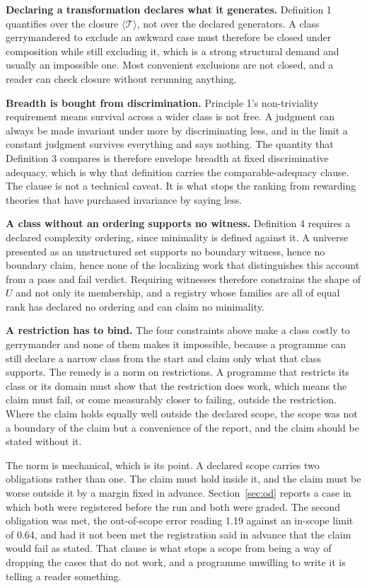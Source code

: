 \documentclass[11pt]{article}
\theoremstyle{remark}
\begin{document}
\textbf{Declaring a transformation declares what it generates.} Definition 1
quantifies over the closure $\langle \mathcal{T} \rangle$, not over the declared
generators. A class gerrymandered to exclude an awkward case must therefore be
closed under composition while still excluding it, which is a strong structural
demand and usually an impossible one. Most convenient exclusions are not closed,
and a reader can check closure without rerunning anything.

\textbf{Breadth is bought from discrimination.} Principle 1's non-triviality
requirement means survival across a wider class is not free. A judgment can always
be made invariant under more by discriminating less, and in the limit a constant
judgment survives everything and says nothing. The quantity that Definition 3
compares is therefore envelope breadth at fixed discriminative adequacy, which is
why that definition carries the comparable-adequacy clause. The clause is not a
technical caveat. It is what stops the ranking from rewarding theories that have
purchased invariance by saying less.

\textbf{A class without an ordering supports no witness.} Definition 4 requires a
declared complexity ordering, since minimality is defined against it. A universe
presented as an unstructured set supports no boundary witness, hence no boundary
claim, hence none of the localizing work that distinguishes this account from a
pass and fail verdict. Requiring witnesses therefore constrains the shape of $U$
and not only its membership, and a registry whose families are all of equal rank
has declared no ordering and can claim no minimality.

\textbf{A restriction has to bind.} The four constraints above make a class costly
to gerrymander and none of them makes it impossible, because a programme can still
declare a narrow class from the start and claim only what that class supports. The
remedy is a norm on restrictions. A programme that restricts its class or its
domain must show that the restriction does work, which means the claim must fail,
or come measurably closer to failing, outside the restriction. Where the claim
holds equally well outside the declared scope, the scope was not a boundary of the
claim but a convenience of the report, and the claim should be stated without it.

The norm is mechanical, which is its point. A declared scope carries two
obligations rather than one. The claim must hold inside it, and the claim must be
worse outside it by a margin fixed in advance. Section~\ref{sec:od} reports a case
in which both were registered before the run and both were graded. The second
obligation was met, the out-of-scope error reading 1.19 against an in-scope limit
of 0.64, and had it not been met the registration said in advance that the claim
would fail as stated. That clause is what stops a scope from being a way of
dropping the cases that do not work, and a programme unwilling to write it is
telling a reader something.
\end{document}
